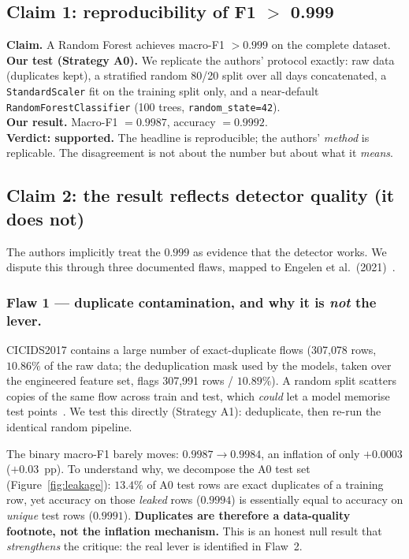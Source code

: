 \documentclass[11pt,a4paper]{article}
\begin{document}
\subsection{Claim 1: reproducibility of F1 $>$ 0.999}
\textbf{Claim.} A Random Forest achieves macro-F1 $>0.999$ on the complete dataset.\\
\textbf{Our test (Strategy A0).} We replicate the authors' protocol exactly: raw data
(duplicates kept), a stratified random 80/20 split over all days concatenated, a
\texttt{StandardScaler} fit on the training split only, and a near-default
\texttt{RandomForestClassifier} (100 trees, \texttt{random\_state=42}).\\
\textbf{Our result.} Macro-F1 $=\mathbf{0.9987}$, accuracy $=0.9992$.\\
\textbf{Verdict: supported.} The headline is reproducible; the authors' \emph{method} is
replicable. The disagreement is not about the number but about what it \emph{means}.

\subsection{Claim 2: the result reflects detector quality (it does not)}
The authors implicitly treat the $0.999$ as evidence that the detector works.
We dispute this through three documented flaws, mapped to Engelen et al.\ (2021)~\cite{engelen2021}.

\subsubsection*{Flaw 1 --- duplicate contamination, and why it is \emph{not} the lever.}
CICIDS2017 contains a large number of exact-duplicate flows
(307{,}078 rows, $10.86\%$ of the raw data; the deduplication mask used by the models, taken
over the engineered feature set, flags 307{,}991 rows / $10.89\%$). A random split scatters
copies of the same flow across train and test, which \emph{could} let a model memorise test
points~\cite{engelen2021}. We test this directly (Strategy A1): deduplicate, then re-run the
identical random pipeline.

The binary macro-F1 barely moves: $0.9987 \rightarrow 0.9984$, an inflation of only
$+0.0003$ ($+0.03$~pp). To understand why, we decompose the A0 test set
(Figure~\ref{fig:leakage}): $13.4\%$ of A0 test rows are exact duplicates of a training row,
yet accuracy on those \emph{leaked} rows ($0.9994$) is essentially equal to accuracy on
\emph{unique} test rows ($0.9991$). \textbf{Duplicates are therefore a data-quality footnote,
not the inflation mechanism.} This is an honest null result that \emph{strengthens} the
critique: the real lever is identified in Flaw~2.
\end{document}
